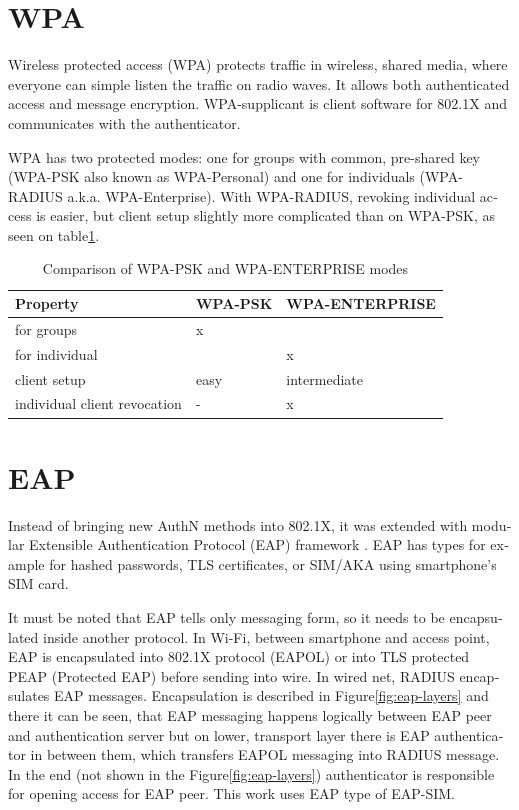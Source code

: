 \documentclass[12pt,a4paper,english]{tutthesis}
\begin{document}
\begin{otherlanguage}{english}
\section{WPA}
\label{sec-2-3}

Wireless protected access (WPA) protects traffic in wireless,
shared media, where everyone can simple listen the traffic on
radio waves. It allows both authenticated access and message
encryption.
WPA-supplicant is client software for 802.1X and communicates with the authenticator.

WPA has two protected modes: one for groups with common, pre-shared
key (WPA-PSK also known as WPA-Personal) and one for individuals
(WPA-RADIUS a.k.a. WPA-Enterprise).  With WPA-RADIUS, revoking
individual access is easier, but client setup slightly more
complicated than on WPA-PSK, as seen on table\ref{psk-enterprise}.

\begin{table}[htb]
\caption{\label{psk-enterprise}Comparison of WPA-PSK and WPA-ENTERPRISE modes}
\centering
\begin{tabular}{lll}
Property & WPA-PSK & WPA-ENTERPRISE\\
\hline
for groups & x & \\
for individual &  & x\\
client setup & easy & intermediate\\
individual client revocation & - & x\\
\hline
\end{tabular}
\end{table}

\section{EAP}
\label{sec-2-4}

Instead of bringing new AuthN methods into 802.1X, it was 
extended with modular Extensible Authentication Protocol (EAP) 
framework \cite{rfc5247}. EAP has types for example for hashed
passwords, TLS certificates, or SIM/AKA using smartphone's SIM card.

It must be noted that EAP tells only messaging form, so it needs
to be encapsulated inside another protocol.  In Wi-Fi, between
smartphone and access point, EAP is encapsulated into 802.1X protocol
(EAPOL) or into TLS protected PEAP (Protected EAP) \cite{peap} before
sending into wire. In wired net, RADIUS encapsulates EAP
messages. Encapsulation is described in Figure\ref{fig:eap-layers}
and there it can be seen, that 
EAP messaging happens logically between EAP peer and authentication
server but on lower, transport layer there is EAP authenticator in
between them, which transfers EAPOL messaging into RADIUS message.
In the end (not shown in the Figure\ref{fig:eap-layers}) authenticator is
responsible for opening access for EAP peer. This work uses EAP type of EAP-SIM.




\end{otherlanguage}
\end{document}

